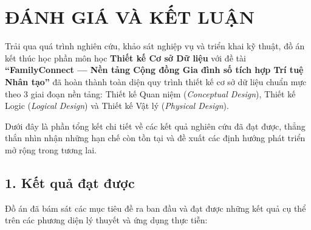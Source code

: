 \chapter*{ĐÁNH GIÁ VÀ KẾT LUẬN}
{}
\label{chap:danh_gia_ket_luan}

Trải qua quá trình nghiên cứu, khảo sát nghiệp vụ và triển khai kỹ thuật, đồ án kết thúc học phần môn học \textbf{Thiết kế Cơ sở Dữ liệu} với đề tài \textbf{``FamilyConnect --- Nền tảng Cộng đồng Gia đình số tích hợp Trí tuệ Nhân tạo''} đã hoàn thành toàn diện quy trình thiết kế cơ sở dữ liệu chuẩn mực theo 3 giai đoạn nền tảng: Thiết kế Quan niệm (\textit{Conceptual Design}), Thiết kế Logic (\textit{Logical Design}) và Thiết kế Vật lý (\textit{Physical Design}). 

Dưới đây là phần tổng kết chi tiết về các kết quả nghiên cứu đã đạt được, thẳng thắn nhìn nhận những hạn chế còn tồn tại và đề xuất các định hướng phát triển mở rộng trong tương lai.

\section*{1. Kết quả đạt được}
{}

Đồ án đã bám sát các mục tiêu đề ra ban đầu và đạt được những kết quả cụ thể trên các phương diện lý thuyết và ứng dụng thực tiễn:

